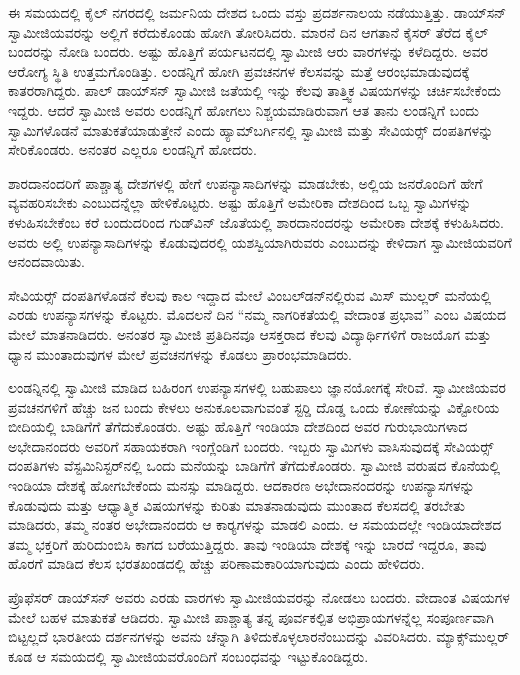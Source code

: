  ಈ ಸಮಯದಲ್ಲಿ ಕೈಲ್ ನಗರದಲ್ಲಿ ಜರ್ಮನಿಯ ದೇಶದ ಒಂದು ವಸ್ತು ಪ್ರದರ್ಶನಾಲಯ ನಡೆಯುತ್ತಿತ್ತು. ಡಾಯ್‍ಸನ್‍ ಸ್ವಾಮೀಜಿಯವರನ್ನು ಅಲ್ಲಿಗೆ ಕರೆದುಕೊಂಡು ಹೋಗಿ ತೋರಿಸಿದರು. ಮಾರನೆ ದಿನ ಆಗತಾನೆ ಕೈಸರ್ ತೆರೆದ ಕೈಲ್ ಬಂದರನ್ನು ನೋಡಿ ಬಂದರು. ಅಷ್ಟು ಹೊತ್ತಿಗೆ ಪರ್ಯಟನದಲ್ಲಿ ಸ್ವಾಮೀಜಿ ಆರು ವಾರಗಳನ್ನು ಕಳೆದಿದ್ದರು. ಅವರ ಆರೋಗ್ಯ ಸ್ಥಿತಿ ಉತ್ತಮಗೊಂಡಿತ್ತು. ಲಂಡನ್ನಿಗೆ ಹೋಗಿ ಪ್ರವಚನಗಳ ಕೆಲಸವನ್ನು ಮತ್ತೆ ಆರಂಭಮಾಡುವುದಕ್ಕೆ ಕಾತರರಾಗಿದ್ದರು. ಪಾಲ್ ಡಾಯ್‍ಸನ್‍ ಸ್ವಾಮೀಜಿ ಜತೆಯಲ್ಲಿ ಇನ್ನು ಕೆಲವು ತಾತ್ತ್ವಿಕ ವಿಷಯಗಳನ್ನು ಚರ್ಚಿಸಬೇಕೆಂದು ಇದ್ದರು. ಆದರೆ ಸ್ವಾಮೀಜಿ ಅವರು ಲಂಡನ್ನಿಗೆ ಹೋಗಲು ನಿಶ್ಚಯಮಾಡಿರುವಾಗ ಆತ ತಾನು ಲಂಡನ್ನಿಗೆ ಬಂದು ಸ್ವಾಮಿಗಳೊಡನೆ ಮಾತುಕತೆಯಾಡುತ್ತೇನೆ ಎಂದು ಹ್ಯಾಮ್‍ಬರ್ಗಿನಲ್ಲಿ ಸ್ವಾಮೀಜಿ ಮತ್ತು ಸೇವಿಯರ್ಸ್‍‍ ದಂಪತಿಗಳನ್ನು ಸೇರಿಕೊಂಡರು. ಅನಂತರ ಎಲ್ಲರೂ ಲಂಡನ್ನಿಗೆ ಹೋದರು. 

 ಶಾರದಾನಂದರಿಗೆ ಪಾಶ್ಚಾತ್ಯ ದೇಶಗಳಲ್ಲಿ ಹೇಗೆ ಉಪನ್ಯಾಸಾದಿಗಳನ್ನು ಮಾಡಬೇಕು, ಅಲ್ಲಿಯ ಜನರೊಂದಿಗೆ ಹೇಗೆ ವ್ಯವಹರಿಸಬೇಕು ಎಂಬುದನ್ನೆಲ್ಲಾ ಹೇಳಿಕೊಟ್ಟರು. ಅಷ್ಟು ಹೊತ್ತಿಗೆ ಅಮೇರಿಕಾ ದೇಶದಿಂದ ಒಬ್ಬ ಸ್ವಾಮಿಗಳನ್ನು ಕಳುಹಿಸಬೇಕೆಂಬ ಕರೆ ಬಂದುದರಿಂದ ಗುಡ್‍ವಿನ್ ಜೊತೆಯಲ್ಲಿ ಶಾರದಾನಂದರನ್ನು ಅಮೇರಿಕಾ ದೇಶಕ್ಕೆ ಕಳುಹಿಸಿದರು. ಅವರು ಅಲ್ಲಿ ಉಪನ್ಯಾಸಾದಿಗಳನ್ನು ಕೊಡುವುದರಲ್ಲಿ ಯಶಸ್ವಿಯಾಗಿರುವರು ಎಂಬುದನ್ನು ಕೇಳಿದಾಗ ಸ್ವಾಮೀಜಿಯವರಿಗೆ ಆನಂದವಾಯಿತು. 

 ಸೇವಿಯರ್ಸ್‍‍ ದಂಪತಿಗಳೊಡನೆ ಕೆಲವು ಕಾಲ ಇದ್ದಾದ ಮೇಲೆ ವಿಂಬಲ್‍ಡನ್\break ‍ನಲ್ಲಿರುವ ಮಿಸ್ ಮುಲ್ಲರ್ ಮನೆಯಲ್ಲಿ ಎರಡು ಉಪನ್ಯಾಸಗಳನ್ನು ಕೊಟ್ಟರು. ಮೊದಲನೆ ದಿನ “ನಮ್ಮ ನಾಗರಿಕತೆಯಲ್ಲಿ ವೇದಾಂತ ಪ್ರಭಾವ” ಎಂಬ ವಿಷಯದ ಮೇಲೆ ಮಾತನಾಡಿದರು. ಅನಂತರ ಸ್ವಾಮೀಜಿ ಪ್ರತಿದಿನವೂ ಆಸಕ್ತರಾದ ಕೆಲವು ವಿದ್ಯಾರ್ಥಿಗಳಿಗೆ ರಾಜಯೊಗ ಮತ್ತು ಧ್ಯಾನ ಮುಂತಾದುವುಗಳ ಮೇಲೆ ಪ್ರವಚನಗಳನ್ನು ಕೊಡಲು ಪ್ರಾರಂಭಮಾಡಿದರು. 

 ಲಂಡನ್ನಿನಲ್ಲಿ ಸ್ವಾಮೀಜಿ ಮಾಡಿದ ಬಹಿರಂಗ ಉಪನ್ಯಾಸಗಳಲ್ಲಿ ಬಹುಪಾಲು ಜ್ಞಾನಯೋಗಕ್ಕೆ ಸೇರಿವೆ. ಸ್ವಾಮೀಜಿಯವರ ಪ್ರವಚನಗಳಿಗೆ ಹೆಚ್ಚು ಜನ ಬಂದು ಕೇಳಲು ಅನುಕೂಲವಾಗುವಂತೆ ಸ್ಟರ‍್ಡಿ ದೊಡ್ಡ ಒಂದು ಕೋಣೆಯನ್ನು ವಿಕ್ಟೋರಿಯ ಬೀದಿಯಲ್ಲಿ ಬಾಡಿಗೆಗೆ ತೆಗೆದುಕೊಂಡರು. ಅಷ್ಟು ಹೊತ್ತಿಗೆ ಇಂಡಿಯಾ ದೇಶದಿಂದ ಅವರ ಗುರುಭಾಯಿಗಳಾದ ಅಭೇದಾನಂದರು ಅವರಿಗೆ ಸಹಾಯಕರಾಗಿ ಇಂಗ್ಲೆಂಡಿಗೆ ಬಂದರು. ಇಬ್ಬರು ಸ್ವಾಮಿಗಳು ವಾಸಿಸುವುದಕ್ಕೆ ಸೇವಿಯರ್ಸ್‍‍ ದಂಪತಿಗಳು ವೆಸ್ಟಮಿನಿಸ್ಟರ್‌ನಲ್ಲಿ ಒಂದು ಮನೆಯನ್ನು ಬಾಡಿಗೆಗೆ ತೆಗೆದುಕೊಂಡರು. ಸ್ವಾಮೀಜಿ ವರುಷದ ಕೊನೆಯಲ್ಲಿ ಇಂಡಿಯಾ ದೇಶಕ್ಕೆ ಹೋಗಬೇಕೆಂದು ಮನಸ್ಸು ಮಾಡಿದ್ದರು. ಆದಕಾರಣ ಅಭೇದಾನಂದರನ್ನು ಉಪನ್ಯಾಸಗಳನ್ನು ಕೊಡುವುದು ಮತ್ತು ಆಧ್ಯಾತ್ಮಿಕ ವಿಷಯಗಳನ್ನು ಕುರಿತು ಮಾತನಾಡುವುದು ಮುಂತಾದ ಕೆಲಸದಲ್ಲಿ ತರಬೇತು ಮಾಡಿದರು, ತಮ್ಮ ನಂತರ ಅಭೇದಾನಂದರು ಆ ಕಾರ‍್ಯಗಳನ್ನು ಮಾಡಲಿ ಎಂದು. ಆ ಸಮಯದಲ್ಲೇ ಇಂಡಿಯಾದೇಶದ ತಮ್ಮ ಭಕ್ತರಿಗೆ ಹುರಿದುಂಬಿಸಿ ಕಾಗದ ಬರೆಯುತ್ತಿದ್ದರು. ತಾವು ಇಂಡಿಯಾ ದೇಶಕ್ಕೆ ಇನ್ನು ಬಾರದೆ ಇದ್ದರೂ, ತಾವು ಹೊರಗೆ ಮಾಡಿದ ಕೆಲಸ ಭರತಖಂಡದಲ್ಲಿ ಹೆಚ್ಚು ಪರಿಣಾಮಕಾರಿಯಾಗುವುದು ಎಂದು ಹೇಳಿದರು. 

 ಪ್ರೊಫೆಸರ್ ಡಾಯ್‍ಸನ್‍ ಅವರು ಎರಡು ವಾರಗಳು ಸ್ವಾಮೀಜಿಯವರನ್ನು ನೋಡಲು ಬಂದರು. ವೇದಾಂತ ವಿಷಯಗಳ ಮೇಲೆ ಬಹಳ ಮಾತುಕತೆ ಆಡಿದರು. ಸ್ವಾಮೀಜಿ ಪಾಶ್ಚಾತ್ಯ ತನ್ನ ಪೂರ್ವಕಲ್ಪಿತ ಅಭಿಪ್ರಾಯಗಳನ್ನೆಲ್ಲ ಸಂಪೂರ್ಣವಾಗಿ ಬಿಟ್ಟಲ್ಲದೆ ಭಾರತೀಯ ದರ್ಶನಗಳನ್ನು ಅವನು ಚೆನ್ನಾಗಿ ತಿಳಿದುಕೊಳ್ಳಲಾರನೆಂಬುದನ್ನು ವಿವರಿಸಿದರು. ಮ್ಯಾಕ್ಸ್‌ಮುಲ್ಲರ್ ಕೂಡ ಆ ಸಮಯದಲ್ಲಿ ಸ್ವಾಮೀಜಿಯವರೊಂದಿಗೆ ಸಂಬಂಧವನ್ನು ಇಟ್ಟುಕೊಂಡಿದ್ದರು. 

